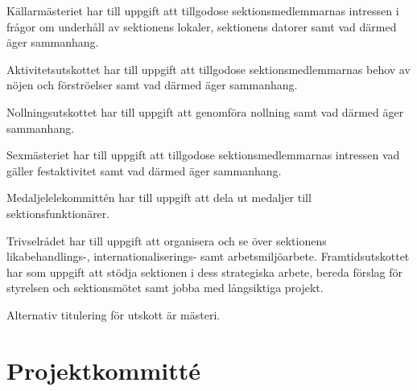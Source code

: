 \documentclass[stadgar]{dsekprotokoll}
\begin{document}
\begin{stadgeavsnitt}

Källarmästeriet har till uppgift att tillgodose sektionsmedlemmarnas intressen i frågor om underhåll av sektionens lokaler, sektionens datorer samt vad därmed äger sammanhang.


Aktivitetsutskottet har till uppgift att tillgodose sektionsmedlemmarnas behov
av nöjen och förströelser samt vad därmed äger sammanhang.


Nollningsutskottet har till uppgift att genomföra nollning samt vad därmed äger sammanhang.


Sexmästeriet har till uppgift att tillgodose sektionsmedlemmarnas intressen
vad gäller festaktivitet samt vad därmed äger sammanhang.


Medaljelelekommittén har till uppgift att dela ut medaljer till
sektionsfunktionärer.


Trivselrådet har till uppgift att organisera och se över sektionens likabehandlings-, internationaliserings- samt arbetsmiljöarbete.
Framtidsutskottet har som uppgift att stödja sektionen i dess strategiska arbete, bereda förslag för styrelsen och sektionsmötet samt jobba med långsiktiga projekt.


Alternativ titulering för utskott är mästeri.

\end{stadgeavsnitt}

\section{Projektkommitté}
\end{document}
